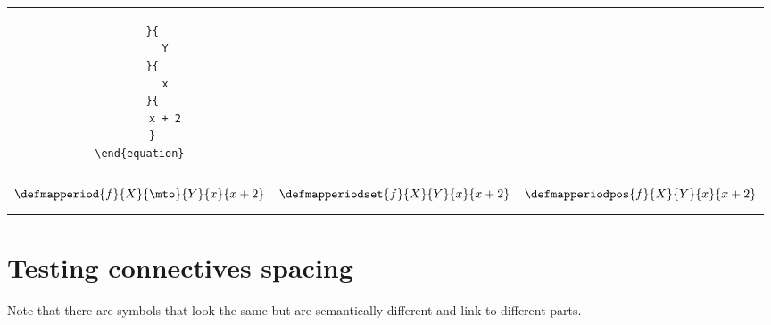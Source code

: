 \begin{widepar}
\begin{tabular}{|c|c|c|}
\begin{minipage}{0.3\textwidth}
\begin{verbatim}
    }{
        Y
    }{
        x
    }{
        x + 2
    }
\end{equation}
            \end{verbatim}
        \end{minipage}
        \\
        \begin{minipage}{0.3\textwidth}
            \begin{equation}
                \defmapperiod{
                    f
                }{
                    X
                }{
                    \mto
                }{
                    Y
                }{
                    x
                }{
                    x + 2
                }
            \end{equation}
        \end{minipage}
         &
        \begin{minipage}{0.3\textwidth}
            \begin{equation}
                \defmapperiodset{
                    f
                }{
                    X
                }{
                    Y
                }{
                    x
                }{
                    x + 2
                }
            \end{equation}
        \end{minipage}
         &
        \begin{minipage}{0.3\textwidth}
            \begin{equation}
                \defmapperiodpos{
                    f
                }{
                    X
                }{
                    Y
                }{
                    x
                }{
                    x + 2
                }
            \end{equation}
        \end{minipage}
        \\\hline
    \end{tabular}
\end{widepar}

\ifextraspace{\vfill\pagebreak}

\section{Testing connectives spacing}

Note that there are symbols that look the same but are semantically different and link to different parts.

